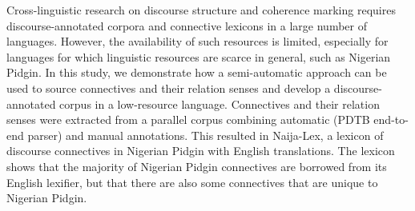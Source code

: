 Cross-linguistic research on discourse structure and coherence marking requires discourse-annotated corpora and connective lexicons in a large number of languages. However, the availability of such resources is limited, especially for languages for which linguistic resources are scarce in general, such as Nigerian Pidgin. In this study, we demonstrate how a semi-automatic approach can be used to source connectives and their relation senses and develop a discourse-annotated corpus in a low-resource language. Connectives and their relation senses were extracted from a parallel corpus combining automatic (PDTB end-to-end parser) and manual annotations. This resulted in Naija-Lex, a lexicon of discourse connectives in Nigerian Pidgin with English translations. The lexicon shows that the majority of Nigerian Pidgin connectives are borrowed from its English lexifier, but that there are also some connectives that are unique to Nigerian Pidgin.
